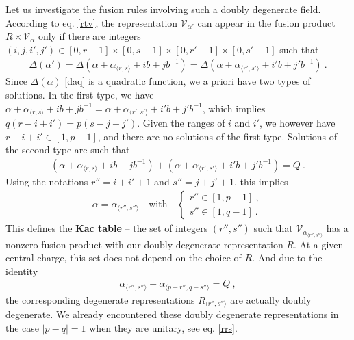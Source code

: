 \documentclass[12pt, a4paper, notitlepage, twoside]{report}
\numberwithin{equation}{section}
\theoremstyle{break}
\begin{document}
Let us investigate the fusion rules involving such a doubly degenerate field.
According to eq. \eqref{rtv}, the representation $\mathcal{V}_{\alpha'} $ can appear in the fusion product $R\times \mathcal{V}_\alpha$ only if there are integers $(i,j,i',j')\in [0,r-1]\times [0,s-1]\times [0,r'-1]\times [0,s'-1]$ such that 
\begin{align}
 \Delta(\alpha') = \Delta\left(\alpha+\alpha_{\langle r,s \rangle} + ib+jb^{-1}\right) = \Delta\left(\alpha+\alpha_{\langle r',s' \rangle} +i'b+j'b^{-1}\right) \ .
\end{align}
Since $\Delta(\alpha)$ \eqref{daq} is a quadratic function, we a priori have two types of solutions.
In the first type, we have $\alpha+\alpha_{\langle r,s \rangle} + ib+jb^{-1} = \alpha+\alpha_{\langle r',s' \rangle} +i'b+j'b^{-1}$, which implies $q(r-i+i')=p(s-j+j')$.
Given the ranges of $i$ and $i'$, we however have $r-i+i'\in [1,p-1]$, and there are no solutions of the first type.
Solutions of the second type are such that 
\begin{align}
 \left(\alpha+\alpha_{\langle r,s \rangle} + ib+jb^{-1}\right) + \left(\alpha+\alpha_{\langle r',s' \rangle} +i'b+j'b^{-1}\right) = Q\ .
\end{align}
Using the notations $r'' = i+i'+1$ and $s''=j+j'+1$, this implies
\begin{align}
 \alpha=\alpha_{\langle r'',s'' \rangle}\quad \text{with}\quad  \left\{\begin{array}{l}  r'' \in [1,p-1]\ , \\ s'' \in [1,q-1]\ . \end{array}\right. 
\label{rpsq}
\end{align}
This defines the \textbf{\boldmath Kac table} -- the set of integers $(r'',s'')$ such that $\mathcal{V}_{\alpha_{\langle r'',s''\rangle}}$ has a nonzero fusion product with our doubly degenerate representation $R$.
At a given central charge, this set does not depend on the choice of $R$. 
And due to the identity 
\begin{align}
 \alpha_{\langle r'',s'' \rangle}+\alpha_{\langle p-r'',q-s'' \rangle}=Q\ ,
\end{align}
the corresponding degenerate representations $R_{\langle r'', s'' \rangle}$ are actually doubly degenerate. 
We already encountered these doubly degenerate representations in the case $|p-q|=1$ when they are unitary, see eq. \eqref{rrs}. 
\end{document}
